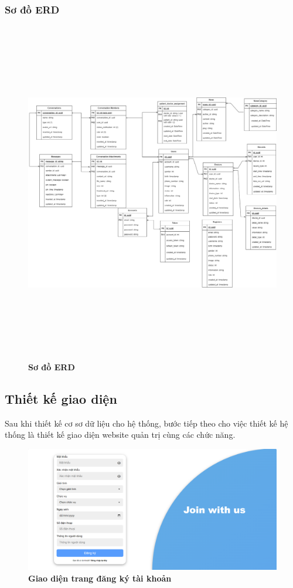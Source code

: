 \subsubsection{Sơ đồ ERD}

\begin{figure}[H]
  \centering
  \includegraphics[width=15cm,height=15cm]{Images/system/fmECG_database.png}
  \caption[Sơ đồ ERD]{\bfseries \fontsize{12pt}{0pt}\selectfont Sơ đồ ERD}
  \label{fmECG_architecture-Database} %
\end{figure}

\subsection{Thiết kế giao diện}

Sau khi thiết kế cơ sơ dữ liệu cho hệ thống, bước tiếp theo cho việc thiết kế hệ thống là thiết kế giao diện website quản trị cùng các chức năng. 
\begin{figure}[H]
  \centering
  \includegraphics[scale=0.4]{Images/server/webUI/register_2.png}
  \caption[Giao diện trang đăng ký tài khoản]{\bfseries \fontsize{12pt}{0pt}\selectfont Giao diện trang đăng ký tài khoản}
  \label{register_2} %
\end{figure}


